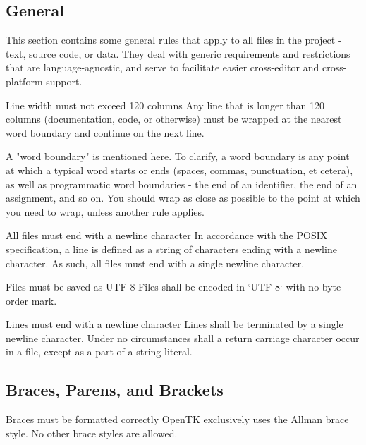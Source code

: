 \documentclass[11pt,a4paper]{article}
\newcounter{rule}[section]
\begin{document}
\subsection{General}
This section contains some general rules that apply to all files in the project - text, source code, or data. They deal with generic requirements and restrictions that are language-agnostic, and serve to facilitate easier cross-editor and cross-platform support.

\begin{must}{Line width must not exceed 120 columns}
Any line that is longer than 120 columns (documentation, code, or otherwise) must be wrapped at the nearest word boundary and continue on the next line. 
\end{must}

A "word boundary" is mentioned here. To clarify, a word boundary is any point at which a typical word starts or ends (spaces, commas, punctuation, et cetera), as well as programmatic word boundaries - the end of an identifier, the end of an assignment, and so on. You should wrap as close as possible to the point at which you need to wrap, unless another rule applies.

\begin{must}{All files must end with a newline character}
In accordance with the POSIX specification, a line is defined as a string of characters ending with a newline character. As such, all files must end with a single newline character.
\end{must}

\begin{must}{Files must be saved as UTF-8}
Files shall be encoded in `UTF-8` with no byte order mark. 
\end{must}

\begin{must}{Lines must end with a newline character}
Lines shall be terminated by a single newline character. Under no circumstances shall a return carriage character occur in a file, except as a part of a string literal.
\end{must}

\subsection{Braces, Parens, and Brackets}
\begin{must}{Braces must be formatted correctly}
OpenTK exclusively uses the Allman brace style. No other brace styles are allowed.
\end{must}
\end{document}
